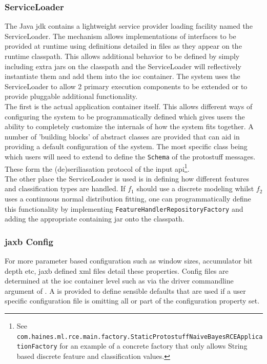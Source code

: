 \documentclass[a4paper,11pt]{scrreprt}
\begin{document}
\subsubsection{ServiceLoader}
The Java \acrshort{jdk} contains a lightweight service provider loading facility named the ServiceLoader. The mechanism allows implementations of interfaces to be provided at runtime using definitions detailed in  files as they appear on the runtime classpath. This allows additional behavior to be defined by simply including extra jars on the classpath and the ServiceLoader will reflectively instantiate them and add them into the \acrshort{ioc} container. The system uses the ServiceLoader to allow 2 primary execution components to be extended or to provide pluggable additional functionality.\\
The first is the actual application container itself. This allows different ways of configuring the system to be programmatically defined which gives users the ability to completely customize the internals of how the system fits together. A number of 'building blocks' of abstract classes are provided that can aid in providing a default configuration of the system. The most specific class being  which users will need to extend to define the \verb|Schema| of the protostuff messages. These form the (de)seriliasation protocol of the input \acrshort{api}\footnote{See \verb|com.haines.ml.rce.main.factory.StaticProtostuffNaiveBayesRCEApplicationFactory| for an example of a concrete factory that only allows String based discrete feature and classification values.}.\\

The other place the ServiceLoader is used is in defining how different features and classification types are handled. If \(f_1\) should use a discrete modeling whilst \(f_2\) uses a continuous normal distribution fitting, one can programmatically define this functionality by implementing \verb|FeatureHandlerRepositoryFactory| and adding the appropriate containing jar onto the classpath. 

\subsubsection{\acrshort{jaxb} Config}
For more parameter based configuration such as window sizes, accumulator bit depth etc, \acrshort{jaxb} defined \acrshort{xml} files detail these properties. Config files are determined at the \acrshort{ioc} container level such as via the driver commandline argument of . A  is provided to define sensible defaults that are used if a user specific configuration file is omitting all or part of the configuration property set.
\end{document}
